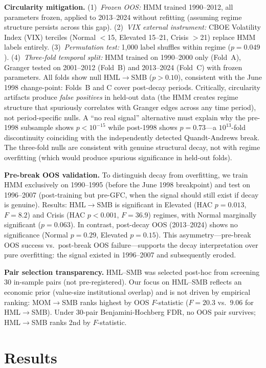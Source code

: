 \documentclass[sigconf,anonymous]{acmart}
\begin{document}
\textbf{Circularity mitigation.}
(1)~\emph{Frozen OOS:} HMM trained 1990--2012, all parameters frozen,
applied to 2013--2024 without refitting (assuming regime structure
persists across this gap).
(2)~\emph{VIX external instrument:} CBOE Volatility Index (VIX) terciles (Normal $<$15,
Elevated 15--21, Crisis $>$21) replace HMM labels entirely.
(3)~\emph{Permutation test:} 1,000 label shuffles within regime ($p = 0.049$).
(4)~\emph{Three-fold temporal split:} HMM trained on 1990--2000 only
(Fold~A), Granger tested on 2001--2012 (Fold~B) and 2013--2024
(Fold~C) with frozen parameters. All folds show null HML$\to$SMB
($p > 0.10$), consistent with the June 1998 change-point: Folds~B
and C cover post-decay periods. Critically, circularity artifacts
produce \emph{false positives} in held-out data (the HMM creates
regime structure that spuriously correlates with Granger edges across
any time period), not period-specific nulls. A ``no real signal''
alternative must explain why the pre-1998 subsample shows $p < 10^{-15}$
while post-1998 shows $p = 0.73$---a $10^{13}$-fold discontinuity
coinciding with the independently detected Quandt-Andrews break.
The three-fold nulls are consistent with genuine structural decay,
not with regime overfitting (which would produce spurious significance
in held-out folds).

\textbf{Pre-break OOS validation.}
To distinguish decay from overfitting, we train HMM exclusively on
1990--1995 (before the June 1998 breakpoint) and test on 1996--2007
(post-training but pre-GFC, when the signal should still exist if
decay is genuine). Results: HML$\to$SMB is significant in Elevated
(HAC $p = 0.013$, $F = 8.2$) and Crisis (HAC $p < 0.001$, $F = 36.9$)
regimes, with Normal marginally significant ($p = 0.063$).
In contrast, post-decay OOS (2013--2024) shows no significance
(Normal $p = 0.29$, Elevated $p = 0.15$).
This asymmetry---pre-break OOS success vs.\ post-break OOS failure---supports
the decay interpretation over pure overfitting: the signal existed
in 1996--2007 and subsequently eroded.

\textbf{Pair selection transparency.} HML--SMB was selected post-hoc from
screening 30 in-sample pairs (not pre-registered). Our focus on HML--SMB
reflects an economic prior (value-size institutional overlap) and is not
driven by empirical ranking: MOM$\to$SMB ranks highest by OOS $F$-statistic
($F = 20.3$ vs.\ $9.06$ for HML$\to$SMB).
Under 30-pair Benjamini-Hochberg FDR, no OOS pair survives; HML$\to$SMB
ranks 2nd by $F$-statistic.

\section{Results}
\end{document}
